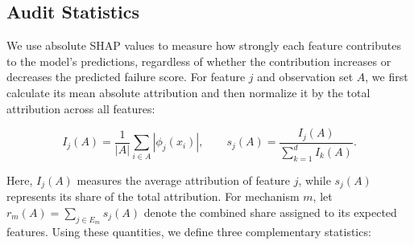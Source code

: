 \documentclass[conference]{IEEEtran}
\begin{document}


\subsection{Audit Statistics}
\label{sec:stats}

We use absolute SHAP values to measure how strongly each feature contributes to the model's predictions, regardless of whether the contribution increases or decreases the predicted failure score. For feature $j$ and observation set $A$, we first calculate its mean absolute attribution and then normalize it by the total attribution across all features:

\begin{equation}
I_j(A)=\frac{1}{|A|}\sum_{i\in A}|\phi_j(x_i)|,
\qquad
s_j(A)=\frac{I_j(A)}{\sum_{k=1}^{d}I_k(A)}.
\label{eq:mean_shap}
\end{equation}

Here, $I_j(A)$ measures the average attribution of feature $j$, while $s_j(A)$ represents its share of the total attribution. For mechanism $m$, let $r_m(A)=\sum_{j\in E_m}s_j(A)$ denote the combined share assigned to its expected features. Using these quantities, we define three complementary statistics:
\end{document}
